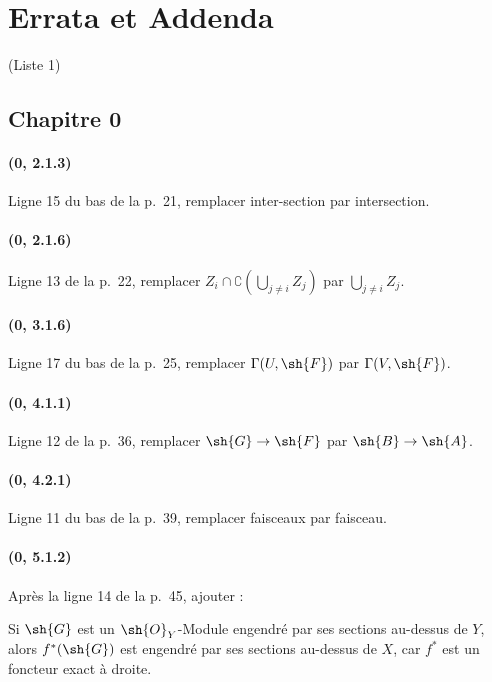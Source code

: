 \clearpage
{}
{}
\section*{Errata et Addenda}
\thispagestyle{plain}
\begin{center}
\large (Liste 1)
\end{center}

\subsection*{Chapitre 0}

\paragraph{(0, 2.1.3)}
Ligne 15 du bas de la p.~21, remplacer inter-section par
intersection.

\paragraph{(0, 2.1.6)}
Ligne 13 de la p.~22, remplacer $Z_i\cap\complement(\bigcup\limits_{j\ne i}Z_j)$ par
$\bigcup\limits_{j\ne i}Z_j$.

\paragraph{(0, 3.1.6)}
Ligne 17 du bas de la p.~25, remplacer
$\Gamma(U,\sh{F})$ par $\Gamma(V,\sh{F})$.

\paragraph{(0, 4.1.1)}
Ligne 12 de la p.~36, remplacer $\sh{G}\to\sh{F}$ par
$\sh{B}\to\sh{A}$.

\paragraph{(0, 4.2.1)}
Ligne 11 du bas de la p.~39, remplacer faisceaux par faisceau.

\paragraph{(0, 5.1.2)}
Après la ligne 14 de la p.~45, ajouter :

Si $\sh{G}$ est un $\sh{O}_Y$-Module engendré par ses sections au-dessus
de $Y$, alors $f^*(\sh{G})$ est engendré par ses sections au-dessus de
$X$, car $f^*$ est un foncteur exact à droite.

